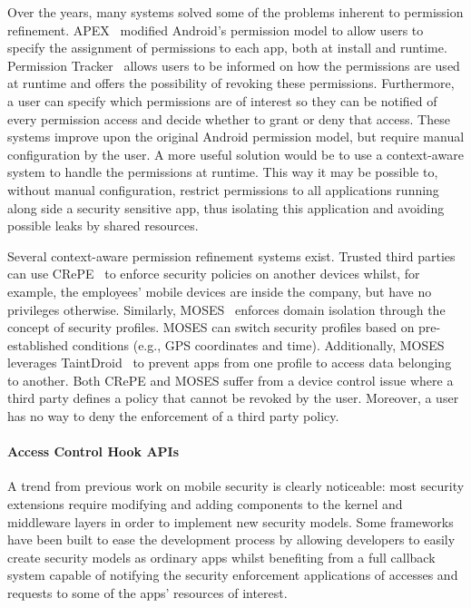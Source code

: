 Over the years, many systems solved some of the problems inherent to permission refinement. APEX~\cite{nauman2010apex} modified Android's permission model to allow users to specify the assignment of permissions to each app, both at install and runtime. Permission Tracker~\cite{kern2012permission} allows users to be informed on how the permissions are used at runtime and offers the possibility of revoking these permissions. Furthermore, a user can specify which permissions are of interest so they can be notified of every permission access and decide whether to grant or deny that access. These systems improve upon the original Android permission model, but require manual configuration by the user. A more useful solution would be to use a context-aware system to handle the permissions at runtime. This way it may be possible to, without manual configuration, restrict permissions to all applications running along side a security sensitive app, thus isolating this application and avoiding possible leaks by shared resources.

Several context-aware permission refinement systems exist. Trusted third parties can use CRePE~\cite{conti2011crepe} to enforce security policies on another devices whilst, for example, the employees' mobile devices are inside the company, but have no privileges otherwise. Similarly, MOSES~\cite{russello2012moses} enforces domain isolation through the concept of security profiles. MOSES can switch security profiles based on pre-established conditions (e.g., GPS coordinates and time).
Additionally, MOSES leverages TaintDroid~\cite{enck2014taintdroid} to prevent apps from one profile to access data belonging to another. Both CRePE and MOSES suffer from a device control issue where a third party defines a policy that cannot be revoked by the user. Moreover, a user has no way to deny the enforcement of a third party policy. 

\paragraph{\textbf{Access Control Hook APIs}}

A trend from previous work on mobile security is clearly noticeable: most security extensions require modifying and adding components to the kernel and middleware layers in order to implement new security models. Some frameworks have been built to ease the development process by allowing developers to easily create security models as ordinary apps whilst benefiting from a full callback system capable of notifying the security enforcement applications of accesses and requests to some of the apps' resources of interest.


